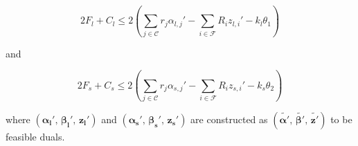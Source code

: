 \documentclass[10pt]{llncs}
\begin{document}
\begin{equation}
2F_{l}+C_{l}\leq2\left(\sum_{j\in\mathcal{C}}r_{j}\alpha_{l,j}'-\sum_{i\in\mathcal{F}}R_{i}z_{l,i}'-k_{l}\theta_{1}\right)
\end{equation}


and

\begin{equation}
2F_{s}+C_{s}\leq2\left(\sum_{j\in\mathcal{C}}r_{j}\alpha_{s,j}'-\sum_{i\in\mathcal{F}}R_{i}z_{s,i}'-k_{s}\theta_{2}\right)
\end{equation}


where $\left(\boldsymbol{\alpha_{l}'},\,\boldsymbol{\beta_{l}'},\,\boldsymbol{z_{l}'}\right)$
and $\left(\boldsymbol{\alpha_{s}'},\,\boldsymbol{\beta_{s}'},\,\boldsymbol{z_{s}'}\right)$
are constructed as $\left(\boldsymbol{\tilde{\alpha'}},\,\boldsymbol{\tilde{\beta'}},\,\boldsymbol{\tilde{z'}}\right)$
to be feasible duals.
\end{document}
